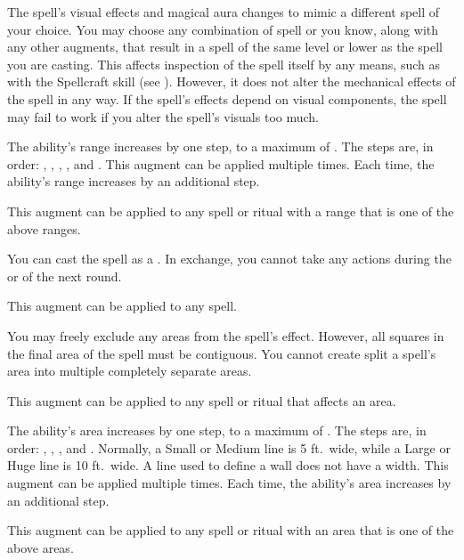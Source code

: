              The spell's visual effects and magical aura changes to mimic a different spell of your choice.
            You may choose any combination of spell or  you know, along with any other augments, that result in a spell of the same level or lower as the spell you are casting.
            This affects inspection of the spell itself by any means, such as with the Spellcraft skill (see ).
            However, it does not alter the mechanical effects of the spell in any way.
            If the spell's effects depend on visual components, the spell may fail to work if you alter the spell's visuals too much. 

             The ability's range increases by one step, to a maximum of \rngext.
            The steps are, in order: \rngtouch, \rngclose, \rngmed, \rnglong, and \rngext.
            This augment can be applied multiple times.
            Each time, the ability's range increases by an additional step.
            \par This augment can be applied to any spell or ritual with a range that is one of the above ranges.

             You can cast the spell as a .
            In exchange, you cannot take any actions during the  or  of the next round.
            \par This augment can be applied to any spell.

             You may freely exclude any areas from the spell's effect.
            However, all squares in the final area of the spell must be contiguous.
            You cannot create split a spell's area into multiple completely separate areas.
            \par This augment can be applied to any spell or ritual that affects an area.

             The ability's area increases by one step, to a maximum of \areahuge.
            The steps are, in order: \areasmall, \areamed, \arealarge, and \areahuge.
            Normally, a Small or Medium line is 5 ft.\ wide, while a Large or Huge line is 10 ft.\ wide.
            A line used to define a wall does not have a width.
            This augment can be applied multiple times.
            Each time, the ability's area increases by an additional step.
            \par This augment can be applied to any spell or ritual with an area that is one of the above areas.

